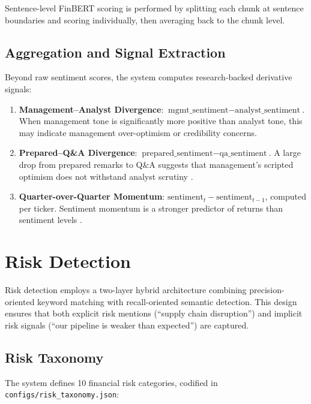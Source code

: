 \documentclass[12pt,a4paper]{article}
\begin{document}
Sentence-level FinBERT scoring is performed by splitting each chunk at sentence boundaries and scoring individually, then averaging back to the chunk level.

\subsection{Aggregation and Signal Extraction}

Beyond raw sentiment scores, the system computes research-backed derivative signals:

\begin{enumerate}[noitemsep]
    \item \textbf{Management--Analyst Divergence}: $\text{mgmt\_sentiment} - \text{analyst\_sentiment}$. When management tone is significantly more positive than analyst tone, this may indicate management over-optimism or credibility concerns.
    \item \textbf{Prepared--Q\&A Divergence}: $\text{prepared\_sentiment} - \text{qa\_sentiment}$. A large drop from prepared remarks to Q\&A suggests that management's scripted optimism does not withstand analyst scrutiny \citep{price2012earnings}.
    \item \textbf{Quarter-over-Quarter Momentum}: $\text{sentiment}_{t} - \text{sentiment}_{t-1}$, computed per ticker. Sentiment momentum is a stronger predictor of returns than sentiment levels \citep{chen2018sentimental}.
\end{enumerate}


\section{Risk Detection}
\label{sec:risk}

Risk detection employs a two-layer hybrid architecture combining precision-oriented keyword matching with recall-oriented semantic detection. This design ensures that both explicit risk mentions (``supply chain disruption'') and implicit risk signals (``our pipeline is weaker than expected'') are captured.

\subsection{Risk Taxonomy}

The system defines 10 financial risk categories, codified in \texttt{configs/risk\_taxonomy.json}:
\end{document}
